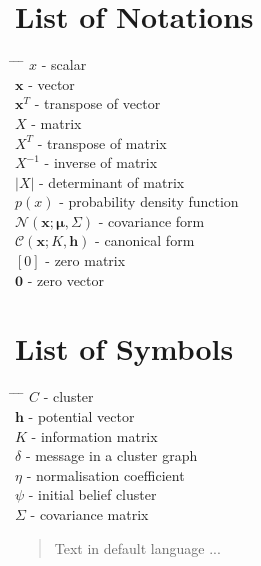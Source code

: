 \documentclass[12pt,oneside,openany,a4paper, %
afrikaans,english,
]{memoir}
\numberwithin{equation}{chapter}
\begin{document}
\chapter{List of Notations}
\begin{tabbing}
\hspace*{1em}\= \hspace*{5em} \= \hspace*{3em} \= \kill %
\> $x$	\> - \> scalar\\
\> $\bm{x}$	\> - \> vector\\
\> $\bm{x}^T$	\> - \> transpose of vector\\
\> $X$ \> - \> matrix\\
\> $X^T$ \> - \> transpose of matrix\\
\> $X^{-1}$ \> - \> inverse of matrix\\
\> $|X|$ \> - \> determinant of matrix\\
\> $p(x)$ \> - \> probability density function\\
\> $\mathcal{N}(\bm{x}; \bm{\mu}, \Sigma)$ \> - \> covariance form\\
\> $\mathcal{C}(\bm{x}; K, \bm{h})$ \> - \> canonical form\\
\> $[0]$ \> - \> zero matrix\\
\> $\bm{0}$ \> - \> zero vector
\end{tabbing}

\chapter{List of Symbols}
\begin{tabbing}
\hspace*{1em}\= \hspace*{5em} \= \hspace*{3em} \= \kill %
\> $C$	\> - \> cluster\\
\> $\bm{h}$	\> - \> potential vector\\
\> $K$	\> - \> information matrix\\
\> $\delta$ \> - \> message in a cluster graph\\
\> $\eta$ \> - \> normalisation coefficient\\
\> $\psi$ \> - \> initial belief cluster\\
\> $\Sigma$ \> - \> covariance matrix
\end{tabbing}
\begin{abstract}
Text in default language ...
\end{abstract}
\end{document}
